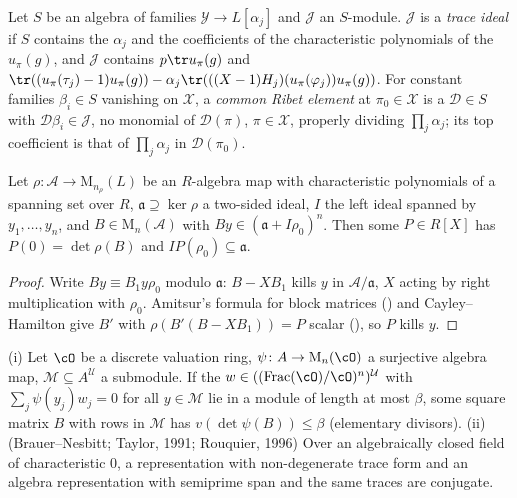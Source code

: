 \begin{definition}
\label{cg-first:def:trace}
Let $S$ be an algebra of families $\mathcal Y\to L[\alpha_j]$ and $\mathcal J$ an $S$-module. $\mathcal J$ is a
\emph{trace ideal} if $S$ contains the $\alpha_j$ and the coefficients of the characteristic polynomials of
the $u_\pi(g)$, and $\mathcal J$ contains $p\tr u_\pi(g)$ and
$\tr((u_\pi(\tau_j)-1)u_\pi(g))-\alpha_j\tr(((X-1)H_j)(u_\pi(\varphi_j))u_\pi(g))$. For constant families $\beta_i\in S$ vanishing on
$\mathcal X$, a \emph{common Ribet element} at $\pi_0\in\mathcal X$ is a $\mathcal D\in S$ with $\mathcal D\beta_i\in\mathcal J$,
no monomial of $\mathcal D(\pi)$, $\pi\in\mathcal X$, properly dividing $\prod_j\alpha_j$; its top coefficient is that of
$\prod_j\alpha_j$ in $\mathcal D(\pi_0)$.
\end{definition}

\begin{proposition}\label{cg-first:prop:method}
Let $\rho\colon\mathcal A\to\mathrm M_{n_\rho}(L)$ be an $R$-algebra map with characteristic polynomials of a spanning
set over $R$, $\mathfrak a\supseteq\ker\rho$ a two-sided ideal, $I$ the left ideal spanned by
$y_1,\dots,y_n$, and $B\in\mathrm M_n(\mathcal A)$ with $By\in(\mathfrak a+I\rho_0)^n$. Then some $P\in R[X]$ has
$P(0)=\det\rho(B)$ and $IP(\rho_0)\subseteq\mathfrak a$.
\end{proposition}

\begin{proof}
Write $By\equiv B_1y\rho_0$ modulo $\mathfrak a$: $B-XB_1$ kills $y$ in $\mathcal A/\mathfrak a$, $X$ acting
by right multiplication with $\rho_0$. Amitsur's formula for block matrices
() and Cayley--Hamilton give $B'$ with
$\rho(B'(B-XB_1))=P$ scalar (), so $P$ kills $y$.
\end{proof}

\begin{fact}\label{cg-first:fact:fitting}
(i) Let $\cO$ be a discrete valuation ring, $\psi\colon A\to\mathrm M_n(\cO)$ a
surjective algebra map, $\mathcal M\subseteq A^{\mathcal U}$ a submodule. If the $w\in((\mathrm{Frac}(\cO)/\cO)^n)^{\mathcal U}$ with
$\sum_j\psi(y_j)w_j=0$ for all $y\in\mathcal M$ lie in a module of length at most $\beta$, some square matrix $B$
with rows in $\mathcal M$ has $v(\det\psi(B))\le\beta$ (elementary divisors). (ii) (Brauer--Nesbitt; Taylor, 1991;
Rouquier, 1996) Over an algebraically closed field of
characteristic $0$, a representation with non-degenerate trace form and an algebra representation
with semiprime span and the same traces are conjugate.
\end{fact}

